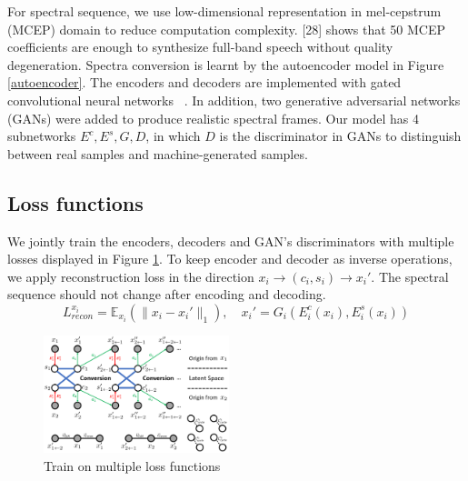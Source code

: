 \documentclass{article}
\begin{document}
For spectral sequence, we use low-dimensional representation in mel-cepstrum (MCEP) domain to reduce computation complexity. [28] shows that 50 MCEP coefficients are enough to synthesize full-band speech without quality degeneration. Spectra conversion is learnt by the autoencoder model in Figure \ref{autoencoder}. The encoders and decoders are implemented with gated convolutional neural networks ~\cite{dauphin2017language}. In addition, two generative adversarial networks (GANs) were added to produce realistic spectral frames. Our model has 4 subnetworks $E^c, E^s, G, D$, in which $D$ is the discriminator in GANs to distinguish between real samples and machine-generated samples.


\subsection{Loss functions}
We jointly train the encoders, decoders and GAN's discriminators with multiple losses displayed in Figure \ref{loss}. To keep encoder and decoder as inverse operations, we apply reconstruction loss in the direction $x_i \rightarrow (c_i, s_i) \rightarrow x_i'$. The spectral sequence should not change after encoding and decoding.
\begin{equation}
L_{recon}^{x_i} = \mathbb{E}_{x_i}(\| x_i - x_i' \|_1), \quad x_i' = G_i(E_i^c(x_i), E_i^s(x_i))
\end{equation}

\begin{figure}[htb]
\includegraphics[width=0.48\textwidth]{FIG/loss}
\caption{Train on multiple loss functions}
\label{loss}
\end{figure}
\end{document}
